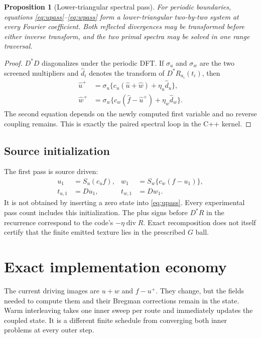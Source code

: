 \documentclass[10pt,twocolumn]{article}
\newtheorem{proposition}{Proposition}[section]
\theoremstyle{definition}\newtheorem{remark}[proposition]{Remark}
\begin{document}
\begin{proposition}[Lower-triangular spectral pass]
For periodic boundaries, equations \eqref{eq:upass}--\eqref{eq:wpass} form a
lower-triangular two-by-two system at every Fourier coefficient.  Both
reflected divergences may be transformed before either inverse transform,
and the two primal spectra may be solved in one range traversal.
\end{proposition}
\begin{proof}
$D^*D$ diagonalizes under the periodic DFT.  If $\sigma_u$ and $\sigma_w$
are the two screened multipliers and $\widehat d_i$ denotes the transform
of $D^*R_{a_i}(t_i)$, then
\begin{align*}
\widehat u^+&=\sigma_u\{c_u(\widehat u+\widehat w)
+\eta_u\widehat d_u\},\\
\widehat w^+&=\sigma_w\{c_w(\widehat f-\widehat u^+)
+\eta_w\widehat d_w\}.
\end{align*}
The second equation depends on the newly computed first variable and no
reverse coupling remains.  This is exactly the paired spectral loop in the
C++ kernel.
\end{proof}


\subsection{Source initialization}
The first pass is source driven:
\begin{align}
u_1&=S_u(c_uf),&w_1&=S_w\{c_w(f-u_1)\},\nonumber\\
t_{u,1}&=Du_1,&t_{w,1}&=Dw_1.
\label{eq:first}
\end{align}
It is not obtained by inserting a zero state into \eqref{eq:upass}.
Every experimental pass count includes this initialization.
The plus signs before $D^*R$ in the recurrence correspond to the code's
$-\eta\operatorname{div}R$. Exact recomposition does not itself certify
that the finite emitted texture lies in the prescribed $G$ ball.

\section{Exact implementation economy}
The current driving images are $u+w$ and $f-u^+$. They change, but the
fields needed to compute them and their Bregman corrections remain in the
state. Warm interleaving takes one inner sweep per route and immediately
updates the coupled state. It is a different finite schedule from converging
both inner problems at every outer step.
\end{document}

